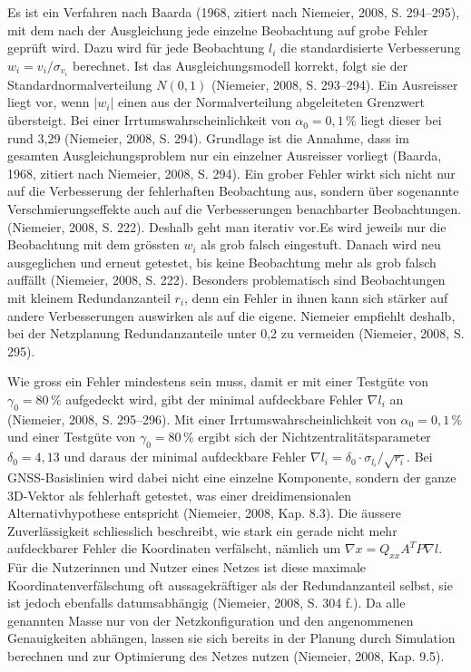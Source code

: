 Es ist ein Verfahren nach Baarda (1968, zitiert nach Niemeier, 2008, S. 294--295), mit dem nach der Ausgleichung jede einzelne Beobachtung auf grobe Fehler geprüft wird. 
Dazu wird für jede Beobachtung $l_i$ die standardisierte Verbesserung $w_i = v_i / \sigma_{v_i}$ berechnet. Ist das Ausgleichungsmodell korrekt, folgt sie der Standardnormalverteilung $N(0,1)$ (Niemeier, 2008, S. 293--294). 
Ein Ausreisser liegt vor, wenn $\lvert w_i \rvert$ einen aus der Normalverteilung abgeleiteten Grenzwert übersteigt. Bei einer Irrtumswahrscheinlichkeit von $\alpha_0 = 0{,}1\,\%$ liegt dieser bei rund 3,29 (Niemeier, 2008, S. 294). 
Grundlage ist die Annahme, dass im gesamten Ausgleichungsproblem nur ein einzelner Ausreisser vorliegt (Baarda, 1968, zitiert nach Niemeier, 2008, S. 294). 
Ein grober Fehler wirkt sich nicht nur auf die Verbesserung der fehlerhaften Beobachtung aus, sondern über sogenannte Verschmierungseffekte auch auf die Verbesserungen benachbarter Beobachtungen.(Niemeier, 2008, S. 222).
Deshalb geht man iterativ vor.Es wird jeweils nur die Beobachtung mit dem grössten $w_i$ als grob falsch eingestuft.
Danach wird neu ausgeglichen und erneut getestet, bis keine Beobachtung mehr als grob falsch auffällt (Niemeier, 2008, S. 222). 
Besonders problematisch sind Beobachtungen mit kleinem Redundanzanteil $r_i$, denn ein Fehler in ihnen kann sich stärker auf andere Verbesserungen auswirken als auf die eigene. 
Niemeier empfiehlt deshalb, bei der Netzplanung Redundanzanteile unter 0,2 zu vermeiden (Niemeier, 2008, S. 295).\bigskip 

Wie gross ein Fehler mindestens sein muss, damit er mit einer Testgüte von $\gamma_0 = 80\,\%$ aufgedeckt wird, gibt der minimal aufdeckbare Fehler $\nabla l_i$ an (Niemeier, 2008, S. 295--296).
Mit einer Irrtumswahrscheinlichkeit von $\alpha_0 = 0{,}1\,\%$ und einer Testgüte von $\gamma_0 = 80\,\%$ ergibt sich der Nichtzentralitätsparameter $\delta_0 = 4{,}13$ und daraus der minimal aufdeckbare Fehler $\nabla l_i = \delta_0 \cdot \sigma_{l_i} / \sqrt{r_i}$. 
Bei GNSS-Basislinien wird dabei nicht eine einzelne Komponente, sondern der ganze 3D-Vektor als fehlerhaft getestet, was einer dreidimensionalen Alternativhypothese entspricht (Niemeier, 2008, Kap. 8.3). 
Die äussere Zuverlässigkeit schliesslich beschreibt, wie stark ein gerade nicht mehr aufdeckbarer Fehler die Koordinaten verfälscht, nämlich um $\nabla x = Q_{xx} A^T P \nabla l$. 
Für die Nutzerinnen und Nutzer eines Netzes ist diese maximale Koordinatenverfälschung oft aussagekräftiger als der Redundanzanteil selbst, sie ist jedoch ebenfalls datumsabhängig (Niemeier, 2008, S. 304 f.). 
Da alle genannten Masse nur von der Netzkonfiguration und den angenommenen Genauigkeiten abhängen, lassen sie sich bereits in der Planung durch Simulation berechnen und zur Optimierung des Netzes nutzen (Niemeier, 2008, Kap. 9.5).

